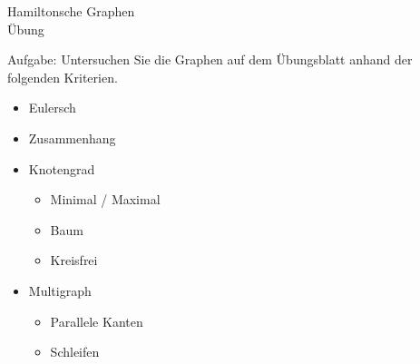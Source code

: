 \documentclass{beamer}
\begin{document}
%
% 
%
\begin{frame}{Hamiltonsche Graphen\\\normalsize{Übung}}
\begin{block}{Aufgabe:}
	Untersuchen Sie die Graphen auf dem Übungsblatt anhand der folgenden Kriterien.
\end{block}
\begin{itemize}
	\item Eulersch
	\item Zusammenhang
	\item Knotengrad
	\begin{itemize}
		\item Minimal / Maximal
		\item Baum
		\item Kreisfrei
	\end{itemize}
	\item Multigraph
	\begin{itemize}
		\item Parallele Kanten
		\item Schleifen
	\end{itemize}
\end{itemize}
\end{frame}
\end{document}
